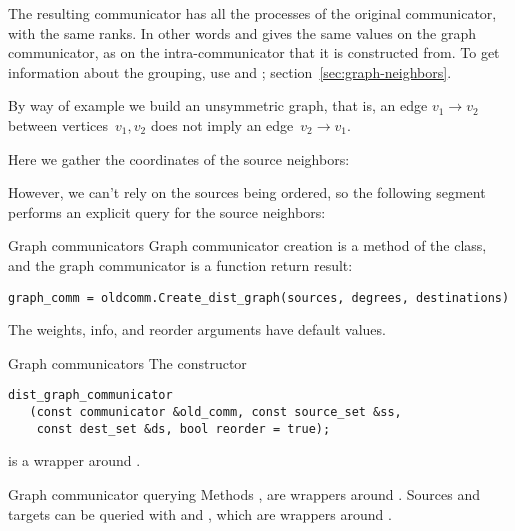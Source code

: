 The resulting communicator has all the processes of the original
communicator, with the same ranks.
In other words  and 
gives the same values on the graph communicator, as on the intra-communicator
that it is constructed from.
To get information about the grouping,
use 
and ;
section~\ref{sec:graph-neighbors}.

By way of example we build an unsymmetric graph, that is,
an edge $v_1\rightarrow v_2$ between vertices~$v_1,v_2$
does not imply an edge~$v_2\rightarrow v_1$.
%

Here we gather the coordinates of the source neighbors:

{
  \def\snippetcodefraction{.45}
  \def\snippetlistfraction{.5}
}

However, we can't rely on the sources being ordered,
so the following segment performs an explicit query for the
source neighbors:

{
  \def\snippetcodefraction{.45}
  \def\snippetlistfraction{.5}
}

\begin{pythonnote}{Graph communicators}
  Graph communicator creation is a method of the  class,
  and the graph communicator is a function return result:
\begin{lstlisting}
graph_comm = oldcomm.Create_dist_graph(sources, degrees, destinations)
\end{lstlisting}
  The weights, info, and reorder arguments have default values.
\end{pythonnote}

\begin{mplnote}{Graph communicators}
  \label{mpl:graph-comm}
  The constructor 
\begin{lstlisting}
dist_graph_communicator
   (const communicator &old_comm, const source_set &ss,
    const dest_set &ds, bool reorder = true);    
\end{lstlisting}
is a wrapper around .
\end{mplnote}
\begin{mplnote}{Graph communicator querying}
  \label{mpl:graph-query}
  Methods , 
  are wrappers around .
  Sources and targets can be queried with
   and ,
  which are wrappers around .
\end{mplnote}

